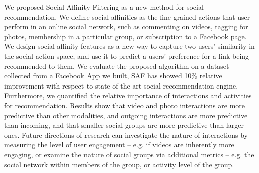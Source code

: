 
We proposed Social Affinity Filtering as a new method for social recommendation.
We define social affinities as the fine-grained actions that user perform in an
online social network, such as commenting on videos, tagging for photos, 
membership in a particular group, or subscription to a Facebook page. 
We design social affinity features as a new way to capture two users' similarity 
in the social action space, and use it to predict a users' preference for a link
being recommended to them. 
We evaluate the proposed algorithm on a dataset collected from a Facebook App we built, 
SAF has showed 10\% relative improvement with respect to 
state-of-the-art social recommendation engine. 
Furthermore, we quantified the relative importance of interactions and activities
for recommendation. Results show that video and photo interactions are more predictive 
than other modalities, and outgoing interactions are more predictive than incoming, 
and that smaller social groups are more predictive than larger ones. 
Future directions of research can investigate the nature of interactions by measuring 
the level of user engagement -- e.g. if videos are inherently more engaging, 
or examine the nature of social groups via additional metrics -- e.g. the social network within members of the group, or activity level of the group. 